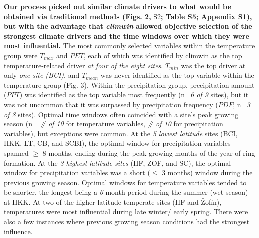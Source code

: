 \documentclass[
]{article}
\begin{document}
\textbf{Our process picked out similar climate drivers to what would be
obtained via traditional methods (Figs. 2, }S2\textbf{; Table S5;
Appendix S1), but with the advantage that \emph{climwin} allowed
objective selection of the strongest climate drivers and the time
windows over which they were most influential.} The most commonly
selected variables within the temperature group were \(T_{max}\) and
\(PET\), each of which was identified by climwin as the top
temperature-related driver \emph{at four of the eight sites}.
\(T_{min}\) was the top driver at only \emph{one site (BCI)}, and
\(T_{mean}\) was never identified as the top variable within the
temperature group (Fig. 3). Within the precipitation group,
precipitation amount (\(PPT\)) was identified as the top variable most
frequently (n=\emph{6 of 9} sites), but it was not uncommon that it was
surpassed by precipitation frequency (\(PDF\); n=\emph{3 of 8} sites).
Optimal time windows often coincided with a site's peak growing season
(n= \emph{\# of 10} for temperature variables, \emph{\# of 10} for
precipitation variables), but exceptions were common. At the \emph{5
lowest latitude} sites (BCI, HKK, LT, CB, and SCBI), the optimal window
for precipitation variables spanned \(\ge\) 8 months, ending during the
peak growing months of the year of ring formation. At the \emph{3
highest latitude sites} (HF, ZOF, and SC), the optimal window for
precipitation variables was a short (\(\le\) 3 months) window during the
previous growing season. Optimal windows for temperature variables
tended to be shorter, the longest being a \emph{6}-month period during
the summer (wet season) at HKK. At two of the higher-latitude temperate
sites (HF and Žofín), temperatures were most influential during late
winter/ early spring. There were also a few instances where previous
growing season conditions had the strongest influence.
\end{document}
